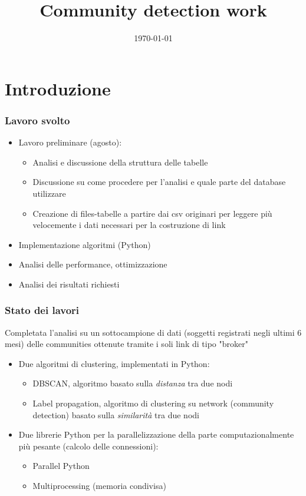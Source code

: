 \documentclass{beamer}
\title{Community detection work}
\institute{MHPC}
\date{\today}
\begin{document}
\begin{frame}
 \titlepage
\end{frame}
\section{Introduzione}
\frame{\sectionpage}
\begin{frame}
 \frametitle{Lavoro svolto}
  \begin{itemize}
  \item Lavoro preliminare (agosto):
  \begin{itemize}
  \item Analisi e discussione della struttura delle tabelle
  \item Discussione su come procedere per l'analisi e quale parte del database utilizzare
  \item Creazione di files-tabelle a partire dai csv originari per leggere più velocemente i dati necessari per la costruzione di link 
  \end{itemize}
  \item Implementazione algoritmi (Python)
  \item Analisi delle performance, ottimizzazione
  \item Analisi dei risultati richiesti
  \end{itemize}
\end{frame}

\begin{frame}
 \frametitle{Stato dei lavori}
 Completata l'analisi su un sottocampione di dati (soggetti registrati negli ultimi 6 mesi) delle communities ottenute tramite i soli link di tipo "broker"
  \begin{itemize}
  \item Due algoritmi di clustering, implementati in Python:
  \begin{itemize}
  \item DBSCAN, algoritmo basato sulla \textit{distanza} tra due nodi
  \item Label propagation, algoritmo di clustering su network (community detection) basato sulla \textit{similarit\`{a}} tra due nodi
  \end{itemize}
  \item Due librerie Python per la parallelizzazione della parte computazionalmente pi\`{u} pesante (calcolo delle connessioni):
  \begin{itemize}
  \item Parallel Python
  \item Multiprocessing (memoria condivisa)
  \end{itemize}
  \end{itemize}
\end{frame}
\end{document}
